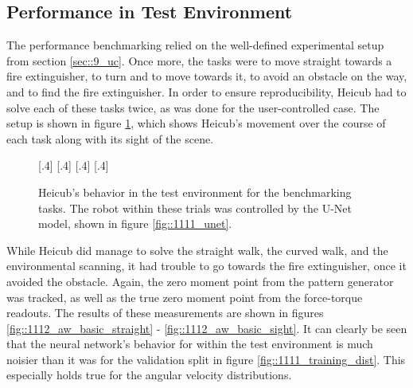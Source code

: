\subsection{Performance in Test Environment}
\label{sec::1112_pt}
The performance benchmarking relied on the well-defined experimental setup from section \ref{sec::9_uc}. Once more, the tasks were to move straight towards a fire extinguisher, to turn and to move towards it, to avoid an obstacle on the way, and to find the fire extinguisher. In order to ensure reproducibility, Heicub had to solve each of these tasks twice, as was done for the user-controlled case. The setup is shown in figure \ref{fig::1112_aw_gif_basic}, which shows Heicub's movement over the course of each task along with its sight of the scene.
\begin{figure}[h!]
	\centering
	[.4\linewidth]{}
	[.4\linewidth]{}
	[.4\linewidth]{}
	[.4\linewidth]{}
	\caption{Heicub's behavior in the test environment for the benchmarking tasks. The robot within these trials was controlled by the U-Net model, shown in figure \ref{fig::1111_unet}.}
	\label{fig::1112_aw_gif_basic}
\end{figure} 
While Heicub did manage to solve the straight walk, the curved walk, and the environmental scanning, it had trouble to go towards the fire extinguisher, once it avoided the obstacle. Again, the zero moment point from the pattern generator was tracked, as well as the true zero moment point from the force-torque readouts. The results of these measurements are shown in figures \ref{fig::1112_aw_basic_straight} - \ref{fig::1112_aw_basic_sight}. It can clearly be seen that the neural network's behavior for within the test environment is much noisier than it was for the validation split in figure \ref{fig::1111_training_dist}. This especially holds true for the angular velocity distributions. 
